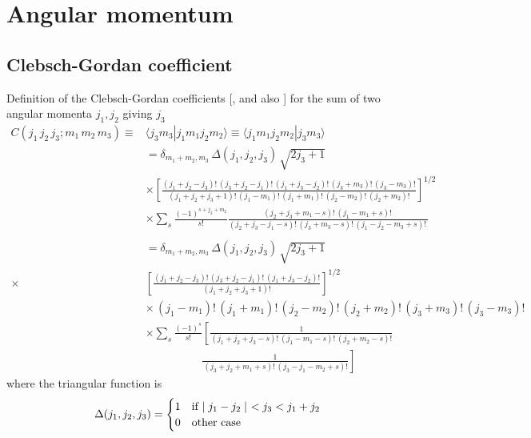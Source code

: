 
\chapter{Angular momentum}
\label{C:angular-momentum}


\section{Clebsch-Gordan coefficient}
\label{S:C-G}

Definition of the Clebsch-Gordan coefficients
[\cite[(B.41)]{Galindo1990_QMvI}, \cite[(3.18,3.19)]{Rose1967_ETO} and also
\cite[(3.6.11)]{Edmonds1960_AMI}] for the sum of two angular momenta $j_{1}, j_{2}$ giving $j_{3}$
%
\begin{align}\label{Q:C-G-definition}
C(j_{1} \, j_{2} \, j_{3}; m_{1} \, m_{2} \, m_{3}) \equiv & \langle j_{3} m_{3}|j_1 m_1 j_2 m_2\rangle  \equiv \langle j_1 m_1 j_2 m_2|j_{3} m_{3}\rangle \nonumber \\ 
&= \delta_{m_{1} +m_{2},m_{3}} \, \Delta(j_{1},j_{2},j_{3}) \, \sqrt{2
j_{3}+1}  \qquad\qquad
\\
&{\times} \left[ \frac{(j_{1}+j_{2}-j_{3})!\,
(j_{3}+j_{2}-j_{1})!\,(j_{1}+j_{3}-j_{2})!\,(j_{3}+m_{3})!\,(j_{3}-
m_{3})! }{(j_{1} +j_{2} + j_{3} +1)! \,(j_{1}- m_{1})! \,(j_{1}+
m_{1})! \,(j_{2}-
m_{2})! \,(j_{2}+ m_{2})!} \right]^{1/2} \nonumber \\
&{\times} \sum_{s} \frac{(-1)^{s + j_{2} + m_{2}}}{s!}\frac{(j_{2} + j_{3} +
m_{1} - s)! \, (j_{1} - m_{1} + s)! \,}{(j_{2} + j_{3} - j_{1} - s)! \,
(j_{3} + m_{3} - s)! \, (j_{1} - j_{2} - m_{3} + s)! \,} \nonumber
\\
\nonumber \\
&= \delta_{m_{1} +m_{2},m_{3}} \, \Delta(j_{1},j_{2},j_{3}) \, \sqrt{2
j_{3}+1} \label{Q:spf1b}
\\
{\times}& \left[ \frac{(j_{1}+j_{2}-j_{3})!\, (j_{3}+j_{2}-j_{1})!\,
(j_{1}+j_{3}-j_{2})!}{(j_{1} +j_{2} + j_{3} +1)!} \right]^{1/2}
\nonumber \\
& {\times}  \,(j_{1}- m_{1})! \,(j_{1}+ m_{1})! \,(j_{2}- m_{2})! \,(j_{2}+
m_{2})! \,(j_{3}+m_{3})!\,(j_{3}- m_{3})! \nonumber
\\
&{\times} \sum_{s} \frac{(-1)^{s}}{s!} \left[ \frac{1}{(j_{1} + j_{2} + j_{3}
- s)! \, (j_{1} - m_{1} - s)! \, (j_{2} + m_{2} - s)! } \right.
\nonumber
\\
& \qquad \qquad \quad \left. \frac{1}{\,(j_{3} + j_{2} + m_{1} + s)!
\, (j_{3} - j_{1} - m_{2} + s)!} \right] \nonumber
\end{align}
%
where the triangular function is
\[
\Delta(j_{1},j_{2},j_{3}) = 
\begin{cases}
1 & \text{if $ \mid j_{1}-j_{2} \mid$ $ < j_{3}<j_{1}+j_{2} $} \\
0 & \text{other case}
\end{cases}
\]
%


